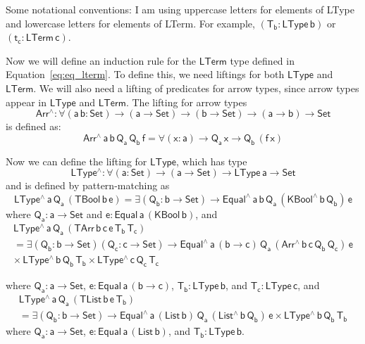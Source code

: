 \documentclass[acmsmall,screen,review,anonymous]{acmart}
\theoremstyle{definition}
\begin{document}

{\color{blue} Some notational conventions: I am using uppercase letters for elements of LType and 
lowercase letters for elements of LTerm. For example, $\mathsf{(T_b : LType \, b)}$ or $\mathsf{(t_c : LTerm \,c)}$.}

Now we will define an induction rule for the $\mathsf{LTerm}$ type defined in 
Equation~\ref{eq:eq_lterm}. To define this, we need liftings for both $\mathsf{LType}$ and
$\mathsf{LTerm}$. We will also need a lifting of predicates for arrow types, since arrow types appear in 
$\mathsf{LType}$ and $\mathsf{LTerm}$. The lifting for arrow types 
\[
  \mathsf{Arr^{\wedge} : \forall (a\, b : Set) \to (a \to Set) \to (b \to Set) \to (a \to b) \to Set}
\]
is defined as: 
\[
  \mathsf{Arr^{\wedge}\, a\, b\, Q_a\, Q_b\, f = \forall (x : a) \to Q_a\, x \to Q_b\, (f\, x)}
\]

\noindent
Now we can define the lifting for $\mathsf{LType}$, which has type 
\[
\mathsf{LType^{\wedge} : \forall (a : Set) \to (a \to Set) \to LType\,a \to Set}
\]
and is defined by pattern-matching as
\[
  \mathsf{LType^{\wedge}\,a\,Q_a\,(TBool\,b\,e) = \exists (Q_b : b \to Set) 
  \to Equal^{\wedge}\, a\, b\, Q_a\, (KBool^{\wedge} \,b \,Q_b) \,e}
\]
where $\mathsf{Q_a : a \to Set}$ and $\mathsf{e : Equal \,a \,(KBool\,b)}$,
and
\begin{multline*}
  \mathsf{LType^{\wedge}\,a\,Q_a\,(TArr\, b\, c\, e\, T_b\, T_c)} \\
\mathsf{=
\exists (Q_b : b \to Set) (Q_c : c \to Set)
  \to Equal^{\wedge}\,a\, (b \to c)\, Q_a\, (Arr^{\wedge} \, b\, c\, Q_b \, Q_c) \, e} \\ 
\mathsf{
  \times \, LType^{\wedge}\,b\,Q_b\,T_b \times LType^{\wedge}\,c\,Q_c\,T_c
}
\end{multline*}

where $\mathsf{Q_a : a \to Set}$, $\mathsf{e : Equal\, a\, (b \to c)}$, $\mathsf{T_b : LType \,b}$, and 
$\mathsf{T_c : LType \,c}$,
and 
\begin{multline*}
  \mathsf{LType^{\wedge}\,a\,Q_a\,(TList\, b\, e\, T_b)} \\
\mathsf{=
\exists (Q_b : b \to Set) 
  \to Equal^{\wedge}\,a\, (List\, b)\, Q_a\, (List^{\wedge} \, b\, Q_b) \, e 
  \times LType^{\wedge}\,b\,Q_b\,T_b 
}
\end{multline*}
where $\mathsf{Q_a : a \to Set}$, $\mathsf{e : Equal\, a\, (List\, b)}$, and $\mathsf{T_b : LType \,b}$.
\end{document}
